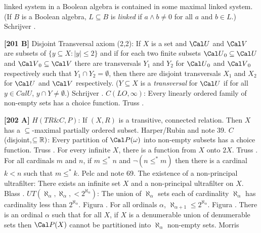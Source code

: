 linked system in a Boolean algebra is contained in some maximal linked
system. (If $B$ is a Boolean algebra, $L\subseteq B$ is {\it linked} if
$a\wedge b\neq 0$ for all $a$ and $b\in L$.) \ac{Schrijver} \cite{1978}.
\smallskip
\item{}{\bf [201 B]}  Disjoint Transversal axiom (2,2): If $X$ is a set
and ${\Cal U}$ and ${\Cal V}$ are subsets of $\{ y\subseteq X :
|y|\le 2\}$ and if for each two finite subsets ${\Cal U}_{0}\subseteq
{\Cal U}$ and ${\Cal V}_{0} \subseteq {\Cal V}$ there are transversals
$Y_{1}$ and $Y_{2}$ for ${\Cal U}_{0}$ and ${\Cal V}_{0}$ respectively
such that $Y_{1} \cap  Y_{2} = \emptyset$, then
there are disjoint transversals $X_{1}$ and $X_{2}$ for ${\Cal U}$ and
${\Cal V}$ respectively. ($Y\subseteq X$ is a {\it transversal} for
${\Cal U}$ if for all $y\in Cal U$, $y\cap Y \ne\emptyset$.)
\ac{Schrijver} \cite{1978}.
\medskip
{} $C(LO,\infty)$: Every linearly ordered family of
non-empty sets has  a choice function.  \ac{Truss} \cite{1978}.
\smallskip
\item{}{\bf [202 A]}  $H(TR\&C,P)$:  If $(X,R)$ is a transitive, connected
relation. Then $X$ has a $\subseteq $-maximal partially ordered subset.
\ac{Harper/Rubin} \cite{1976} and note 39.
\medskip
{} $C$(disjoint,$\subseteq\Bbb R)$: Every partition of
${\Cal P}(\omega)$ into non-empty subsets has a choice function. \ac{Truss}
\cite{1978}.
\medskip
{}  For every infinite $X$, there is a
function from $X$ onto $2X$.  \ac{Truss} \cite{1978}.
\medskip
{} For all cardinals $m$ and $n$, if $m\le^* n$ and
$\neg (n\le^* m)$ then there is a cardinal $k<n$ such that $m\le^* k$.
\ac{Pelc} \cite{1978} and note 69.
\medskip
{} The existence of a non-principal ultrafilter: There
exists an infinite set $X$ and a non-principal ultrafilter on $X$.
\ac{Blass} \cite{1977b}.
\medskip
{} $UT(\aleph_{\alpha },\aleph_{\alpha},
<2^{\aleph_{\alpha }})$: The union of $\aleph_{\alpha}$ sets each of
cardinality $\aleph_{\alpha}$ has cardinality less than
$2^{\aleph_{\alpha}}$.  \ac{Figura} \cite{1977}.
\medskip
{} For all ordinals $\alpha$, $\aleph_{\alpha+1}\le
2^{\aleph_\alpha}$.  \ac{Figura} \cite{1977}.
\medskip
{} There is an ordinal $\alpha$ such that for all
$X$, if $X$ is a denumerable union of denumerable sets then ${\Cal P}(X)$
cannot be partitioned into $\aleph_{\alpha}$ non-empty sets. \ac{Morris}
